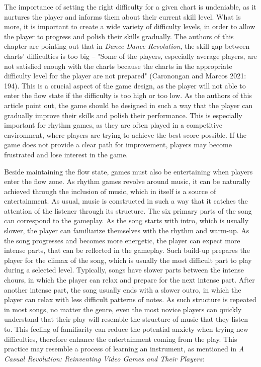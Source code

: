 The importance of setting the right difficulty for a given chart is undeniable, as it nurtures the player and informs them about their current skill level. What is more, it is important to create a wide variety of difficulty levels, in order to allow the player to progress and polish their skills gradually. The authors of this chapter are pointing out that in \textit{Dance Dance Revolution}, the skill gap between charts' difficulties is too big -- "Some of the players, especially average players, are not satisfied enough with the charts because the charts in the appropriate difficulty level for the player are not prepared" (Caronongan and Marcos 2021: 194). This is a crucial aspect of the game design, as the player will not able to enter the flow state if the difficulty is too high or too low. As the authors of this article point out, the game should be designed in such a way that the player can gradually improve their skills and polish their performance. This is especially important for rhythm games, as they are often played in a competitive environment, where players are trying to achieve the best score possible. If the game does not provide a clear path for improvement, players may become frustrated and lose interest in the game.

Beside maintaining the flow state, games must also be entertaining when players enter the flow zone. As rhythm games revolve around music, it can be naturally achieved through the inclusion of music, which in itself is a source of entertainment. As usual, music is constructed in such a way that it catches the attention of the listener through its structure. The six primary parts of the song can correspond to the gameplay. As the song starts with intro, which is usually slower, the player can familiarize themselves with the rhythm and warm-up. As the song progresses and becomes more energetic, the player can expect more intense parts, that can be reflected in the gameplay. Such build-up prepares the player for the climax of the song, which is usually the most difficult part to play during a selected level. Typically, songs have slower parts between the intense chours, in which the player can relax and prepare for the next intense part. After another intense part, the song usually ends with a slower outro, in which the player can relax with less difficult patterns of notes. As such structure is repeated in most songs, no matter the genre, even the most novice players can quickly understand that their play will resemble the structure of music that they listen to. This feeling of familiarity can reduce the potential anxiety when trying new difficulties, therefore enhance the entertainment coming from the play. This practice may resemble a process of learning an instrument, as mentioned in \textit{A Casual Revolution: Reinventing Video Games and Their Players}\cite{casualrevolution}:

